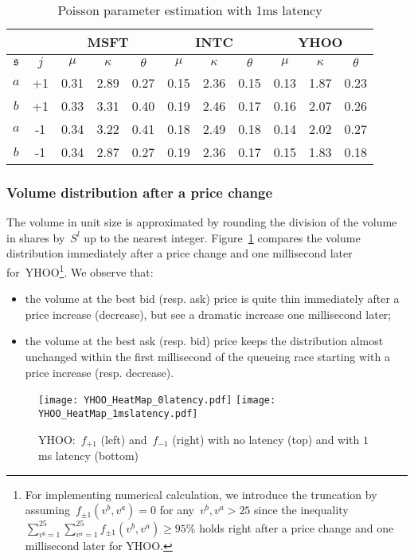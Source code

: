 \documentclass{amsart}[11pt]
\numberwithin{equation}{section}
\theoremstyle{definition}
\newcommand{\ssf}{\mathfrak{s}}
\begin{document}
\begin{table}[!htp]
\centering
\begin{tabular}{|c|c|c|c|c|c|c|c|c|c|c|}
\hline
\multicolumn{2}{|c|}{ } & \multicolumn{3}{|c|}{MSFT}&\multicolumn{3}{|c|}{INTC} & \multicolumn{3}{|c|}{YHOO}\\
\hline
$\ssf$ & $j$ & $\mu$ & $\kappa$ & $\theta$ & $\mu$ & $\kappa$ & $\theta$ &$\mu$ & $\kappa$ & $\theta$\\
\hline
$a$  & +1 &0.31 &2.89 &0.27         &0.15&2.36&0.15        &0.13&1.87&0.23\\
$b$  & +1 &0.33 &3.31 &0.40       &0.19&2.46&0.17        &0.16&2.07&0.26\\
$a$  & -1  &0.34 &3.22 &0.41       &0.18&2.49&0.18        &0.14&2.02&0.27\\
$b$  & -1  &0.34 &2.87 &0.27         &0.19&2.36&0.17        &0.15&1.83&0.18\\
\hline
\end{tabular}
\caption{Poisson parameter estimation with 1ms latency}
\label{tab:ParaEst1msLtc}
\end{table}
\subsubsection{Volume distribution after a price change}
The volume in unit size is approximated by 
rounding the division of the volume in shares by~$S^l$ up to the nearest integer.
Figure~\ref{fig:YHOOf1msltc} compares the volume distribution 
immediately after a price change and one millisecond later for~YHOO\footnote{For implementing numerical calculation, we introduce the truncation by assuming~$f_{\pm 1}(v^b, v^a) = 0$ for any~$v^b, v^a > 25$ 
since the inequality~$\sum_{v^b = 1}^{25}\sum_{v^a = 1}^{25} f_{\pm 1}(v^b, v^a) \geq 95\%$ holds right after a price change and one millisecond later for YHOO.}.
We observe that:
\begin{itemize}
\item the volume at the best bid (resp. ask) price is quite thin immediately after a price increase (decrease), 
but see a dramatic increase one millisecond later;
\item the volume at the best ask (resp. bid) price keeps the distribution almost unchanged within the first millisecond of the queueing race starting with a price increase (resp. decrease).
\end{itemize}
\begin{figure}[!htp]
\centering
\texttt{[image: YHOO\_HeatMap\_0latency.pdf]}
\texttt{[image: YHOO\_HeatMap\_1mslatency.pdf]}
\caption{YHOO:~$f_{+1}$ (left) and~$f_{-1}$ (right) with no latency (top) and with 
$1$ms latency (bottom)}
\label{fig:YHOOf1msltc}
\end{figure}
\end{document}
